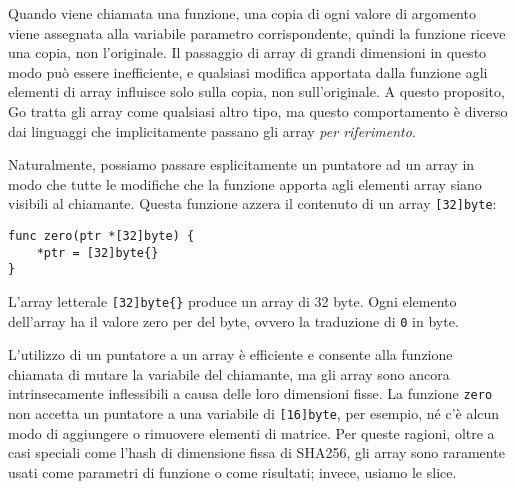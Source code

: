 Quando viene chiamata una funzione, una copia di ogni valore di argomento viene assegnata alla variabile parametro corrispondente, quindi la funzione riceve una copia, non l'originale.
Il passaggio di array di grandi dimensioni in questo modo può essere inefficiente, e qualsiasi modifica apportata dalla funzione agli elementi di array influisce solo sulla copia, non sull'originale.
A questo proposito, Go tratta gli array come qualsiasi altro tipo, ma questo comportamento è diverso dai linguaggi che implicitamente passano gli array \textit{per riferimento}.

Naturalmente, possiamo passare esplicitamente un puntatore ad un array in modo che tutte le modifiche che la funzione apporta agli elementi array siano visibili al chiamante.
Questa funzione azzera il contenuto di un array \verb|[32]byte|:
\begin{lstlisting}[frame=single, label={lst:lstlisting3-1.11}]
func zero(ptr *[32]byte) {
    *ptr = [32]byte{}
}
\end{lstlisting}
L'array letterale \verb|[32]byte{}| produce un array di 32 byte.
Ogni elemento dell'array ha il valore zero per del byte, ovvero la traduzione di \verb|0| in byte.

L'utilizzo di un puntatore a un array è efficiente e consente alla funzione chiamata di mutare la variabile del chiamante, ma gli array sono ancora intrinsecamente inflessibili a causa delle loro dimensioni fisse.
La funzione \verb|zero| non accetta un puntatore a una variabile di \verb|[16]byte|, per esempio, né c'è alcun modo di aggiungere o rimuovere elementi di matrice.
Per queste ragioni, oltre a casi speciali come l'hash di dimensione fissa di SHA256, gli array sono raramente usati come parametri di funzione o come risultati;
invece, usiamo le slice.